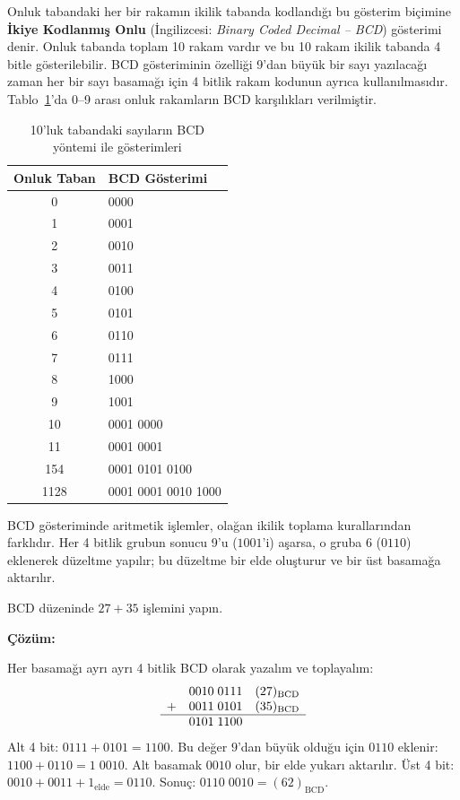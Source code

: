 Onluk tabandaki her bir rakamın ikilik tabanda kodlandığı bu gösterim biçimine \textbf{İkiye Kodlanmış Onlu} (İngilizcesi: \textit{Binary Coded Decimal -- BCD}) gösterimi denir. Onluk tabanda toplam 10 rakam vardır ve bu 10 rakam ikilik tabanda 4 bitle gösterilebilir. BCD gösteriminin özelliği 9'dan büyük bir sayı yazılacağı zaman her bir sayı basamağı için 4 bitlik rakam kodunun ayrıca kullanılmasıdır. Tablo~\ref{tab:bcd-tablo}'da 0--9 arası onluk rakamların BCD karşılıkları verilmiştir.

\begin{table}[H]
\centering
\caption{10'luk tabandaki sayıların BCD yöntemi ile gösterimleri}
\label{tab:bcd-tablo}
\begin{tabular}{cl}
\toprule
\textbf{Onluk Taban} & \textbf{BCD Gösterimi} \\
\midrule
0    & 0000 \\
1    & 0001 \\
2    & 0010 \\
3    & 0011 \\
4    & 0100 \\
5    & 0101 \\
6    & 0110 \\
7    & 0111 \\
8    & 1000 \\
9    & 1001 \\
10   & 0001 0000 \\
11   & 0001 0001 \\
154  & 0001 0101 0100 \\
1128 & 0001 0001 0010 1000 \\
\bottomrule
\end{tabular}
\end{table}

BCD gösteriminde aritmetik işlemler, olağan ikilik toplama kurallarından farklıdır. Her 4 bitlik grubun sonucu 9'u ($1001$'i) aşarsa, o gruba 6 ($0110$) eklenerek düzeltme yapılır; bu düzeltme bir elde oluşturur ve bir üst basamağa aktarılır.

\begin{ornek}[A.22]
BCD düzeninde $27 + 35$ işlemini yapın.

\textbf{Çözüm:}

Her basamağı ayrı ayrı 4 bitlik BCD olarak yazalım ve toplayalım:
\[
\begin{array}{rcl}
  & 0010\;0111 & (27)_{\text{BCD}} \\
+ & 0011\;0101 & (35)_{\text{BCD}} \\
\hline
  & 0101\;1100 &
\end{array}
\]
Alt 4 bit: $0111 + 0101 = 1100$. Bu değer $9$'dan büyük olduğu için $0110$ eklenir: $1100 + 0110 = 1\;0010$. Alt basamak $0010$ olur, bir elde yukarı aktarılır. Üst 4 bit: $0010 + 0011 + 1_{\text{elde}} = 0110$. Sonuç: $0110\;0010 = (62)_{\text{BCD}}$.
\end{ornek}


